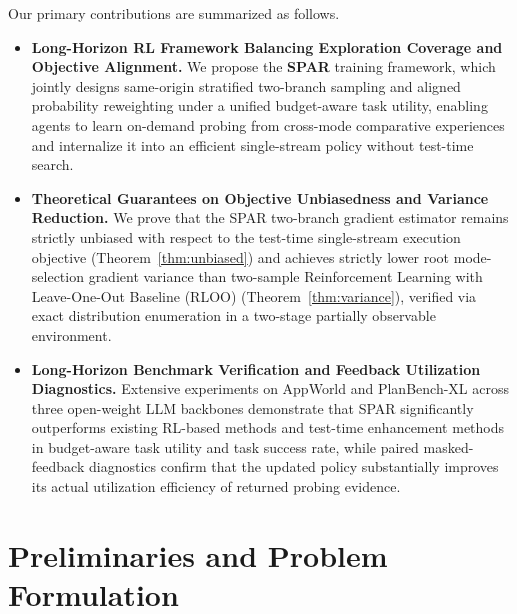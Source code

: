 \documentclass[11pt]{article}
\theoremstyle{definition}
\theoremstyle{remark}
\newcommand{\spar}{\textsc{SPAR}}
\begin{document}
Our primary contributions are summarized as follows.
\begin{itemize}[leftmargin=*, nosep, topsep=2pt]
    \item \textbf{Long-Horizon RL Framework Balancing Exploration Coverage and Objective Alignment.} We propose the \textbf{\spar{}} training framework, which jointly designs same-origin stratified two-branch sampling and aligned probability reweighting under a unified budget-aware task utility, enabling agents to learn on-demand probing from cross-mode comparative experiences and internalize it into an efficient single-stream policy without test-time search.
    \item \textbf{Theoretical Guarantees on Objective Unbiasedness and Variance Reduction.} We prove that the \spar{} two-branch gradient estimator remains strictly unbiased with respect to the test-time single-stream execution objective (Theorem~\ref{thm:unbiased}) and achieves strictly lower root mode-selection gradient variance than two-sample Reinforcement Learning with Leave-One-Out Baseline (RLOO) (Theorem~\ref{thm:variance}), verified via exact distribution enumeration in a two-stage partially observable environment.
    \item \textbf{Long-Horizon Benchmark Verification and Feedback Utilization Diagnostics.} Extensive experiments on AppWorld and PlanBench-XL across three open-weight LLM backbones demonstrate that \spar{} significantly outperforms existing RL-based methods and test-time enhancement methods in budget-aware task utility and task success rate, while paired masked-feedback diagnostics confirm that the updated policy substantially improves its actual utilization efficiency of returned probing evidence.
\end{itemize}

\section{Preliminaries and Problem Formulation}
\label{sec:prelim}
\end{document}
